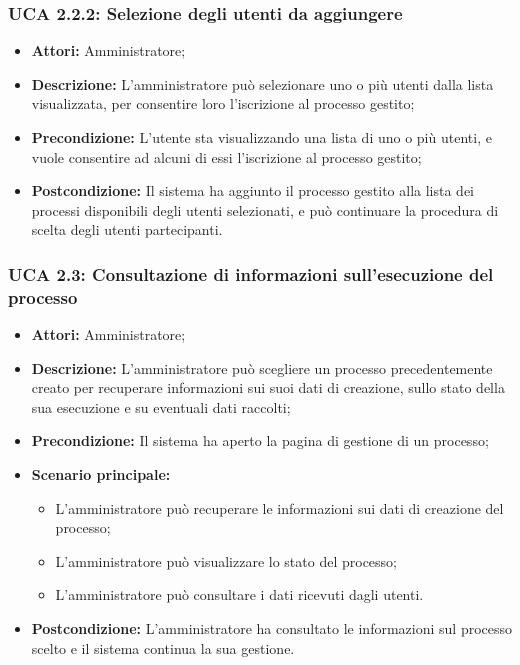 \hypertarget{A2.2.2}{}
\subsubsection{UCA 2.2.2: Selezione degli utenti da aggiungere}
\begin{itemize}
\item \textbf{Attori:}
 Amministratore;
\item \textbf{Descrizione:} 
L'amministratore può selezionare uno o più utenti dalla lista visualizzata, per consentire loro l'iscrizione al processo gestito; 
\item \textbf{Precondizione:} 
L'utente sta visualizzando una lista di uno o più utenti, e vuole consentire ad alcuni di essi l'iscrizione al processo gestito; 
\item \textbf{Postcondizione:} 
Il sistema ha aggiunto il processo gestito alla lista dei processi disponibili degli utenti selezionati, e può continuare la procedura di scelta degli utenti partecipanti.
\end{itemize}

\hypertarget{A2.3}{}
\subsubsection{UCA 2.3: Consultazione di informazioni sull'esecuzione del processo}
\begin{itemize}
\item \textbf{Attori:} Amministratore;
\item \textbf{Descrizione:} 
L'amministratore può scegliere un processo precedentemente creato per recuperare informazioni sui suoi dati di creazione, sullo stato della sua esecuzione e su eventuali dati raccolti; 
\item \textbf{Precondizione:} 
Il sistema ha aperto la pagina di gestione di un processo;
\item \textbf{Scenario principale:} 
\begin{itemize}
\item L'amministratore può recuperare le informazioni sui dati di creazione del processo;
\item L'amministratore può visualizzare lo stato del processo;
\item L'amministratore può consultare i dati ricevuti dagli utenti.
\end{itemize}
\item \textbf{Postcondizione:} 
L'amministratore ha consultato le informazioni sul processo scelto e il sistema continua la sua gestione.
\end{itemize}

